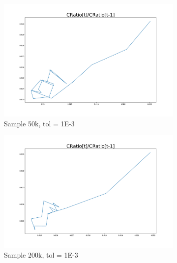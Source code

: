 \documentclass[]{article}
\begin{document}
\begin{figure}
	\centering
	\begin{subfigure}[b]{0.45\textwidth}
		\centering
		\includegraphics[width=1.2\textwidth]{../50kSample_BaseCal/CRatio.pdf}
		\caption{Sample 50k, tol = 1E-3}
		\label{fig:Cratio-50k-Baseline}
	\end{subfigure}
	\hfill
	\begin{subfigure}[b]{0.45\textwidth}
		\centering
		\includegraphics[width=1.2\textwidth]{../200kSample_BaseCal/CRatio.pdf}
		\caption{Sample 200k, tol = 1E-3}
		\label{fig:Cratio-200k-Baseline}
	\end{subfigure}\\
	\begin{subfigure}[b]{0.45\textwidth}
		\centering

\end{subfigure}
\end{figure}
\end{document}
